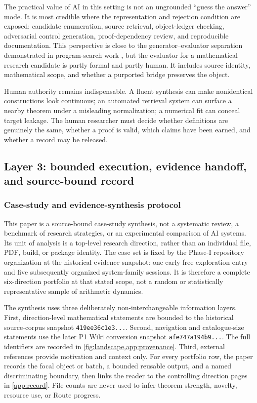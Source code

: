 The practical value of AI in this setting is not an ungrounded ``guess the
answer'' mode. It is most credible where the representation and rejection
condition are exposed: candidate enumeration, source retrieval, object-ledger
checking, adversarial control generation, proof-dependency review, and
reproducible documentation. This perspective is close to the
generator--evaluator separation demonstrated in program-search work
\citep{RomeraParedes2024}, but the evaluator for a mathematical research
candidate is partly formal and partly human. It includes source identity,
mathematical scope, and whether a purported bridge preserves the object.

Human authority remains indispensable. A fluent synthesis can make
nonidentical constructions look continuous; an automated retrieval system can
surface a nearby theorem under a misleading normalization; a numerical fit can
conceal target leakage. The human researcher must decide whether definitions
are genuinely the same, whether a proof is valid, which claims have been
earned, and whether a record may be released.

\subsection{Layer 3: bounded execution, evidence handoff, and source-bound record}
\label{sec:phase1-record}

\subsubsection{Case-study and evidence-synthesis protocol}

This paper is a source-bound case-study synthesis, not a systematic review, a
benchmark of research strategies, or an experimental comparison of AI systems.
Its unit of analysis is a top-level research direction, rather than an
individual file, PDF, build, or package identity. The case set is fixed by the
Phase-I repository organization at the historical evidence snapshot: one early
free-exploration entry and five subsequently organized system-family sessions.
It is therefore a complete six-direction portfolio at that stated scope, not a
random or statistically representative sample of arithmetic dynamics.

The synthesis uses three deliberately non-interchangeable information layers.
First, direction-level mathematical statements are bounded to the historical
source-corpus snapshot \texttt{419ee36c1e3...}. Second, navigation and
catalogue-size statements use the later P1 Wiki conversion snapshot
\texttt{afe747a194b9...}. The full identifiers are recorded in
\cref{fig:landscape,app:provenance}. Third, external references provide
motivation and context only. For every portfolio row, the paper records the
focal object or batch, a bounded reusable output, and a named discriminating
boundary, then links the reader to the controlling direction pages in
\cref{app:record}. File counts are never used to infer theorem strength,
novelty, resource use, or Route progress.

